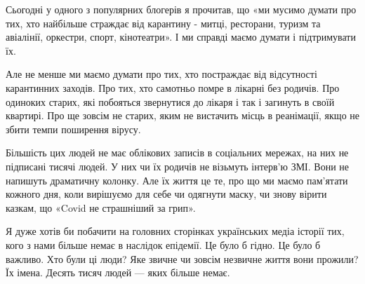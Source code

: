 Сьогодні у одного з популярних блогерів я прочитав, що «ми мусимо думати про
тих, хто найбільше страждає від карантину - митці, ресторани, туризм та
авіалінії, оркестри, спорт, кінотеатри». І ми справді маємо думати і
підтримувати їх. 

Але не менше ми маємо думати про тих, хто постраждає від відсутності
карантинних заходів. Про тих, хто самотньо помре в лікарні без родичів. Про
одиноких старих, які побояться звернутися до лікаря і так і загинуть в своїй
квартирі. Про ще зовсім не старих, яким не вистачить місць в реанімації, якщо
не збити темпи поширення вірусу.

Більшість цих людей не має облікових записів в соціальних мережах, на них не
підписані тисячі людей. У них чи їх родичів не візьмуть інтерв’ю ЗМІ. Вони не
напишуть драматичну колонку. Але їх життя це те, про що ми маємо пам’ятати
кожного дня, коли вирішуємо для себе чи одягнути маску, чи знову вірити казкам,
що «Covid не страшніший за грип».

Я дуже хотів би побачити на головних сторінках українських медіа історії тих,
кого з нами більше немає в наслідок епідемії. Це було б гідно. Це було б
важливо. Хто були ці люди? Яке звичне чи зовсім незвичне життя вони прожили? Їх
імена. Десять тисяч людей --- яких більше немає.
